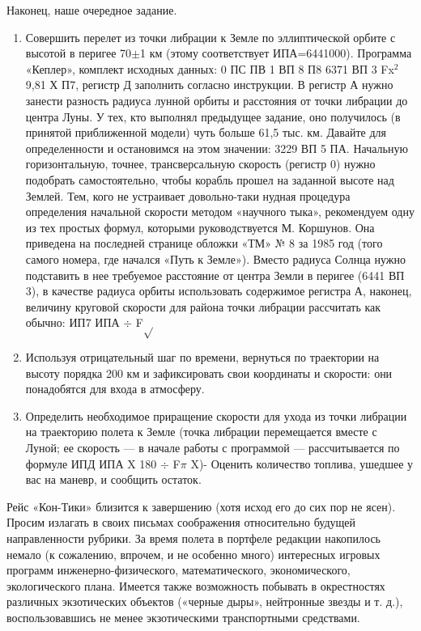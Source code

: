 \documentclass[11pt,a4paper,oneside]{article}
\begin{document}
Наконец, наше очередное задание.
\begin{enumerate}
\item Совершить перелет из точки либрации к Земле по эллиптической орбите с высотой в перигее 70$\pm$1 км (этому соответствует ИПА=6441000). Программа «Кеплер», комплект исходных данных: 0 ПС ПВ 1 ВП 8 П8 6371 ВП 3 Fx$^{2}$ 9,81 Х П7, регистр Д заполнить согласно инструкции. В регистр А нужно занести разность радиуса лунной орбиты и расстояния от точки либрации до центра Луны. У тех, кто выполнял предыдущее задание, оно получилось (в принятой приближенной модели) чуть больше 61,5 тыс. км. Давайте для определенности и остановимся на этом значении: 3229 ВП 5 ПА. Начальную горизонтальную, точнее, трансверсальную скорость (регистр 0) нужно подобрать самостоятельно, чтобы корабль прошел на заданной высоте над Землей. Тем, кого не устраивает довольно-таки нудная процедура определения начальной скорости методом «научного тыка», рекомендуем одну из тех простых формул, которыми руководствуется М. Коршунов. Она приведена на последней странице обложки «ТМ» № 8 за 1985 год (того самого номера, где начался «Путь к Земле»). Вместо радиуса Солнца нужно подставить в нее требуемое расстояние от центра Земли в перигее (6441 ВП 3), в качестве радиуса орбиты использовать содержимое регистра А, наконец, величину круговой скорости для района точки либрации рассчитать как обычно: ИП7 ИПА $\div$ F$\sqrt{}$
\item Используя отрицательный шаг по времени, вернуться по траектории на высоту порядка 200 км и зафиксировать свои координаты и скорости: они понадобятся для входа в атмосферу.
\item Определить необходимое приращение скорости для ухода из точки либрации на траекторию полета к Земле (точка либрации перемещается вместе с Луной; ее скорость — в начале работы с программой — рассчитывается по формуле ИПД ИПА X 180 $\div$ F$\pi$ X)- Оценить количество топлива, ушедшее у вас на маневр, и сообщить остаток.
\end{enumerate}

Рейс «Кон-Тики» близится к завершению (хотя исход его до сих пор не ясен). Просим излагать в своих письмах соображения относительно будущей направленности рубрики. За время полета в портфеле редакции накопилось немало (к сожалению, впрочем, и не особенно много) интересных игровых программ инженерно-физического, математического, экономического, экологического плана. Имеется также возможность побывать в окрестностях различных экзотических объектов («черные дыры», нейтронные звезды и т. д.), воспользовавшись не менее экзотическими транспортными средствами.
\end{document}
